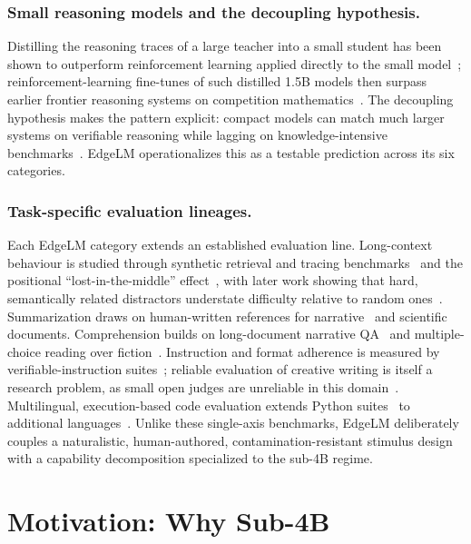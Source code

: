 \documentclass[runningheads]{llncs}
\begin{document}
\subsubsection{Small reasoning models and the decoupling hypothesis.}
Distilling the reasoning traces of a large teacher into a small student has been
shown to outperform reinforcement learning applied directly to the small
model~\cite{deepseekr1}; reinforcement-learning fine-tunes of such distilled
1.5B models then surpass earlier frontier reasoning systems on competition
mathematics~\cite{deepscaler2025,fastcurl2025}. The decoupling hypothesis makes
the pattern explicit: compact models can match much larger systems on verifiable
reasoning while lagging on knowledge-intensive
benchmarks~\cite{vibethinker2026}. EdgeLM operationalizes this as a testable
prediction across its six categories.

\subsubsection{Task-specific evaluation lineages.}
Each EdgeLM category extends an established evaluation line. Long-context
behaviour is studied through synthetic retrieval and tracing
benchmarks~\cite{ruler2024} and the positional ``lost-in-the-middle''
effect~\cite{lostmiddle2023}, with later work showing that hard, semantically
related distractors understate difficulty relative to random
ones~\cite{lcrag2025}. Summarization draws on human-written references for
narrative~\cite{booksum2021} and scientific~\cite{cohan2018,scitldr2020}
documents. Comprehension builds on long-document narrative
QA~\cite{narrativeqa2018,literaryqa2025} and multiple-choice reading over
fiction~\cite{quality2022}. Instruction and format adherence is measured by
verifiable-instruction suites~\cite{ifeval2023}; reliable evaluation of creative
writing is itself a research problem, as small open judges are unreliable in
this domain~\cite{litbench2025,writingprompts2018}. Multilingual, execution-based
code evaluation extends Python suites~\cite{humaneval2021,mbpp2021,livecodebench2024}
to additional languages~\cite{multiple2023,codescope2024}. Unlike these
single-axis benchmarks, EdgeLM deliberately couples a naturalistic,
human-authored, contamination-resistant stimulus design with a capability
decomposition specialized to the sub-4B regime.

\section{Motivation: Why Sub-4B}
\label{sec:why4b}
\end{document}
